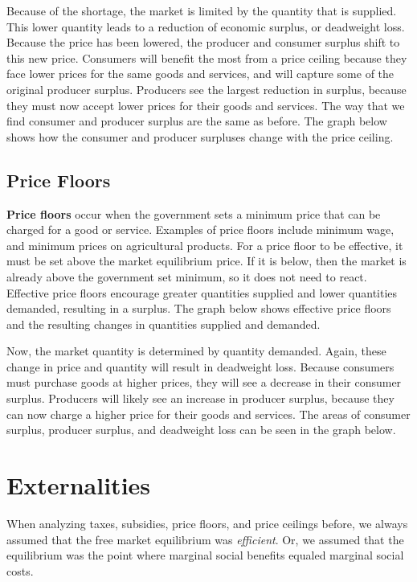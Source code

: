\documentclass[
]{book}
\begin{document}
Because of the shortage, the market is limited by the quantity that is supplied. This lower quantity leads to a reduction of economic surplus, or deadweight loss. Because the price has been lowered, the producer and consumer surplus shift to this new price. Consumers will benefit the most from a price ceiling because they face lower prices for the same goods and services, and will capture some of the original producer surplus. Producers see the largest reduction in surplus, because they must now accept lower prices for their goods and services. The way that we find consumer and producer surplus are the same as before. The graph below shows how the consumer and producer surpluses change with the price ceiling.

\section{Price Floors}\label{price-floors}

\textbf{Price floors} occur when the government sets a minimum price that can be charged for a good or service. Examples of price floors include minimum wage, and minimum prices on agricultural products. For a price floor to be effective, it must be set above the market equilibrium price. If it is below, then the market is already above the government set minimum, so it does not need to react. Effective price floors encourage greater quantities supplied and lower quantities demanded, resulting in a surplus. The graph below shows effective price floors and the resulting changes in quantities supplied and demanded.

Now, the market quantity is determined by quantity demanded. Again, these change in price and quantity will result in deadweight loss. Because consumers must purchase goods at higher prices, they will see a decrease in their consumer surplus. Producers will likely see an increase in producer surplus, because they can now charge a higher price for their goods and services. The areas of consumer surplus, producer surplus, and deadweight loss can be seen in the graph below.

\chapter{Externalities}\label{externalities}

When analyzing taxes, subsidies, price floors, and price ceilings before, we always assumed that the free market equilibrium was \emph{efficient}. Or, we assumed that the equilibrium was the point where marginal social benefits equaled marginal social costs.
\end{document}
